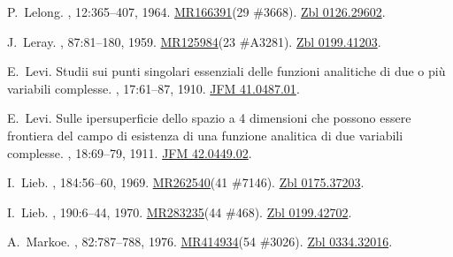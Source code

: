 \documentclass[11pt,a4paper, final, twoside]{article}
\numberwithin{equation}{section}
\begin{document}
\begin{appendices}
\begin{thebibliography}{100}
P.~Lelong.
, 12:365--407, 1964.
\newblock \href{http://www.ams.org/mathscinet-getitem?mr=166391}{MR166391}(29
  \#3668). \href{http://zbmath.org/?q=an:0126.29602}{Zbl 0126.29602}.

J.~Leray.
,
  87:81--180, 1959.
\newblock \href{http://www.ams.org/mathscinet-getitem?mr=125984}{MR125984}(23
  \#A3281). \href{https://zbmath.org/?q=an:0199.41203}{Zbl 0199.41203}.

E.~Levi.
\newblock Studii sui punti singolari essenziali delle funzioni analitiche di
  due o pi\`u variabili complesse.
, 17:61--87, 1910.
\newblock \href{http://zbmath.org/?q=an:41.0487.01}{JFM 41.0487.01}.

E.~Levi.
\newblock Sulle ipersuperficie dello spazio a 4 dimensioni che possono essere
  frontiera del campo di esistenza di una funzione analitica di due variabili
  complesse.
, 18:69--79, 1911.
\newblock \href{http://zbmath.org/?q=an:42.0449.02}{JFM 42.0449.02}.

I.~Lieb.
, 184:56--60, 1969.
\newblock \href{http://www.ams.org/mathscinet-getitem?mr=262540}{MR262540}(41
  \#7146). \href{http://zbmath.org/?q=an:0175.37203}{Zbl 0175.37203}.

I.~Lieb.
, 190:6--44, 1970.
\newblock \href{http://www.ams.org/mathscinet-getitem?mr=283235}{MR283235}(44
  \#468). \href{http://zbmath.org/?q=an:0199.42702}{Zbl 0199.42702}.

A.~Markoe.
, 82:787--788,
  1976.
\newblock \href{http://www.ams.org/mathscinet-getitem?mr=414934}{MR414934}(54
  \#3026). \href{http://zbmath.org/?q=an:0334.32016}{Zbl 0334.32016}.


\end{thebibliography}
\end{appendices}
\end{document}
